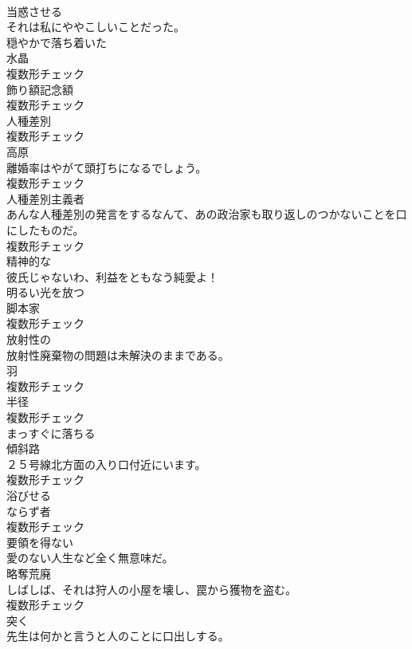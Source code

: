 \documentclass[8pt]{extreport}
\begin{document}
\begin{CJK}{UTF8}{min}
\\	[形容詞]	当惑させる	
\\	それは私にややこしいことだった。	
\\	[形容詞]	穏やかで落ち着いた	
\\	[名詞]	水晶	
\\	複数形チェック
\\	[名詞]	飾り額記念額	
\\	複数形チェック
\\	[名詞]	人種差別	
\\	複数形チェック
\\	[名詞]	高原	
\\	離婚率はやがて頭打ちになるでしょう。	
\\	複数形チェック
\\	[名詞]	人種差別主義者	
\\	あんな人種差別の発言をするなんて、あの政治家も取り返しのつかないことを口にしたものだ。	
\\	複数形チェック
\\	[形容詞]	精神的な	
\\	彼氏じゃないわ、利益をともなう純愛よ！	
\\	[形容詞]	明るい光を放つ	
\\	[名詞]	脚本家	
\\	複数形チェック
\\	[形容詞]	放射性の	
\\	放射性廃棄物の問題は未解決のままである。	
\\	[名詞]	羽	
\\	複数形チェック
\\	[名詞]	半径	
\\	複数形チェック
\\	[動詞]	まっすぐに落ちる	
\\	[名詞]	傾斜路	
\\	２５号線北方面の入り口付近にいます。	
\\	複数形チェック
\\	[動詞]	浴びせる	
\\	[名詞]	ならず者	
\\	複数形チェック
\\	[形容詞]	要領を得ない	
\\	愛のない人生など全く無意味だ。	
\\	[名詞]	略奪荒廃	
\\	しばしば、それは狩人の小屋を壊し、罠から獲物を盗む。	
\\	複数形チェック
\\	[動詞]	突く	
\\	先生は何かと言うと人のことに口出しする。	

\end{CJK}
\end{document}
